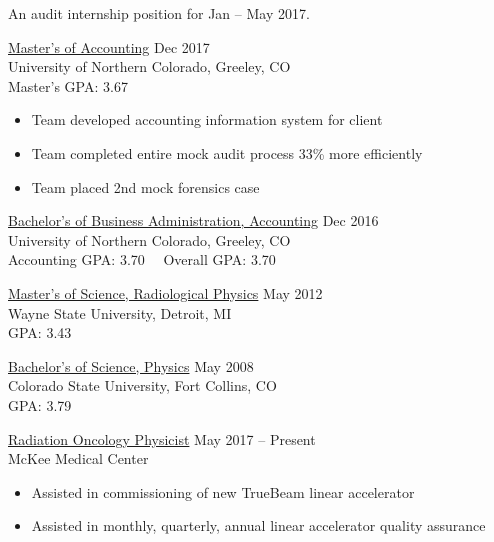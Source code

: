 \documentclass[11pt]{article}
\begin{document}
\begin{description}[leftmargin=!,labelwidth=2cm,align=right]
\item[Objective]
    An audit internship position for Jan -- May 2017.

\item[Education]
    \underline{Master's of Accounting} \hfill Dec 2017\\
    University of Northern Colorado, Greeley, CO\\
    Master's GPA: 3.67
    \begin{itemize}[rightmargin=2cm,noitemsep]
        \item Team developed accounting information system for client
        \item Team completed entire mock audit process 33\% more efficiently
        \item Team placed 2nd mock forensics case
    \end{itemize}

    \underline{Bachelor's of Business Administration, Accounting} \hfill Dec 2016\\
    University of Northern Colorado, Greeley, CO\\
    Accounting GPA: 3.70 \quad\ \  Overall GPA: 3.70

    \underline{Master's of Science, Radiological Physics} \hfill May 2012\\
    Wayne State University, Detroit, MI\\
    GPA: 3.43

    \underline{Bachelor's of Science, Physics} \hfill May 2008\\
    Colorado State University, Fort Collins, CO \\
    GPA: 3.79

\item[Experience]
    \underline{Radiation Oncology Physicist} \hfill May 2017 -- Present\\
    McKee Medical Center
    \begin{itemize}[rightmargin=2cm,noitemsep]
        \item Assisted in commissioning of new TrueBeam linear accelerator
        \item Assisted in monthly, quarterly, annual linear accelerator quality assurance
    \end{itemize}


\end{description}
\end{document}
